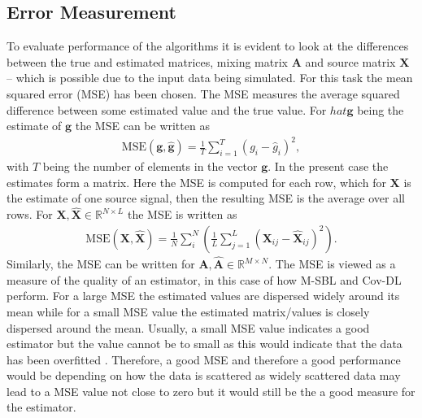 \subsection{Error Measurement}  
To evaluate performance of the algorithms it is evident to look at the differences between the true and estimated matrices, mixing matrix $\mathbf{A}$ and source matrix $\mathbf{X}$ -- which is possible due to the input data being simulated. 
For this task the mean squared error (MSE) has been chosen. 
The MSE measures the average squared difference between some estimated value and the true value. 
For $hat{\textbf{g}}$ being the estimate of $\textbf{g}$ the MSE can be written as 
\begin{align*}
\text{MSE}(\textbf{g},\hat{\textbf{g}}) = \frac{1}{T} \sum_{i=1}^T (g_i - \hat{g}_i)^2,  
\end{align*}
with $T$ being the number of elements in the vector $\textbf{g}$. 
In the present case the estimates form a matrix. Here the MSE is computed for each row, which for $\textbf{X}$ is the estimate of one source signal, then the  resulting MSE is the average over all rows. For $\textbf{X}, \hat{\textbf{X}}\in\mathbb{R}^{N\times L}$ the MSE is written as 
\begin{align*}
\text{MSE}(\textbf{X},\hat{\textbf{X}}) = \frac{1}{N} \sum_{i}^{N} \left( \frac{1}{L} \sum_{j=1}^L (\textbf{X}_{ij} - \hat{\textbf{X}}_{ij})^2\right).  
\end{align*}
Similarly, the MSE can be written for $\textbf{A},\hat{\textbf{A}}\in \mathbb{R}^{M \times N}$.  
The MSE is viewed as a measure of the quality of an estimator, in this case of how M-SBL and Cov-DL perform. 
For a large MSE the estimated values are dispersed widely around its mean while for a small MSE value the estimated matrix/values is closely dispersed around the mean. 
Usually, a small MSE value indicates a good estimator but the value cannot be to small as this would indicate that the data has been overfitted . 
Therefore, a good MSE and therefore a good performance would be depending on how the data is scattered as widely scattered data may lead to a MSE value not close to zero but it would still be the a good measure for the estimator.
